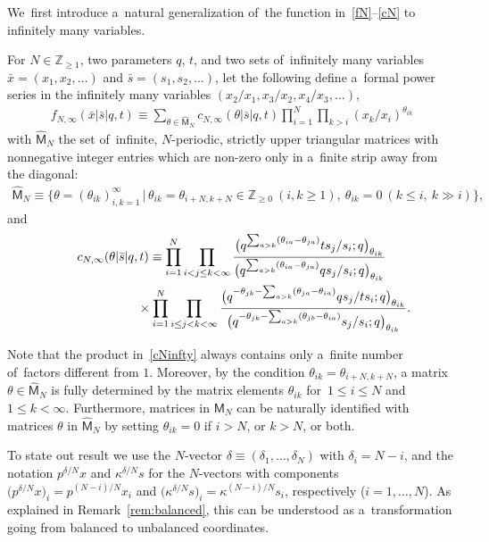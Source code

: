 \documentclass[pdftex]{sigma}%
\numberwithin{equation}{section}
\newcommand{\bx}{\bar{x}}
\newcommand{\bs}{\bar{s}}
\newcommand{\Z}{{\mathbb Z}}
\begin{document}
We~first introduce a~natural generalization of~the function in~\eqref{fN}--\eqref{cN} to infinitely many variables.
\begin{Definition}
\label{def2}
For $N\in\Z_{\geq 1}$, two parameters $q$, $t$, and two sets of~infinitely many variables $\bx=(x_1,x_2,\dots)$ and $\bs=(s_1,s_2,\dots)$, let the following define a~formal power series in the infinitely many variables
$(x_2/x_1,x_3/x_2,x_4/x_3,\dots)$,
\begin{gather}
\label{fNinfty}
 f_{N,\infty}(\bx|\bs|q,t) \equiv \sum_{\theta\in\hat{\mathsf{M}}_N} c_{N,\infty}(\theta|\bs|q,t) \prod_{i=1}^N \prod_{k>i} (x_k/x_i)^{\theta_{ik}}
\end{gather}
with $\hat{\mathsf{M}}_N$ the set of~infinite, $N$-periodic, strictly upper triangular matrices with nonnegative integer entries which are non-zero only in a~finite strip away from the diagonal:
\begin{gather}
\label{hMMN}
\hat{\mathsf{M}}_N\equiv \big\{ \theta=(\theta_{ik})_{i,k=1}^\infty\,|\, \theta_{ik}=\theta_{i+N,k+N}\in\Z_{\geq 0}\ (i,k\geq 1), \ \theta_{ik}=0\ (k\leq i,\ k\gg i)\big\} ,
\end{gather}
and
\begin{gather}
c_{N,\infty}(\theta|\bs|q,t)
\equiv
\prod_{i=1}^N \prod_{i< j\leq k< \infty}
\frac{\big(q^{\sum_{a> k}(\theta_{ia} - \theta_{ja})}ts_{j}/s_i;q\big)_{\theta_{ik}}}{\big(q^{\sum_{a> k}(\theta_{ia} - \theta_{ja})}qs_{j}/s_i;q\big)_{\theta_{ik}}}\nonumber
\\ \hphantom{c_{N,\infty}(\theta|\bs|q,t)\equiv }
{}\times\prod_{i=1}^N \prod_{i\leq j<k<\infty}
\frac{\big(q^{-\theta_{jk}-\sum_{a>k}(\theta_{ja}-\theta_{ia})}qs_{j}/ts_i ;q\big)_{\theta_{ik}}}{\big(q^{-\theta_{jk}-\sum_{a>k}(\theta_{jb}-\theta_{ia})}s_{j}/s_i ;q\big)_{\theta_{ik}}} .
\label{cNinfty}
\end{gather}

\end{Definition}

Note that the product in~\eqref{cNinfty} always contains only a~finite number of~factors different from $1$. Moreover, by the condition $\theta_{ik}=\theta_{i+N,k+N}$,
a matrix $\theta\in\hat{\mathsf{M}}_N$ is fully determined by the matrix elements $\theta_{ik}$ for~$1\leq i\leq N$ and $1\leq k<\infty$.
Furthermore, matrices in $\mathsf{M}_N$ can be naturally identified with matrices $\theta$ in $\hat{\mathsf{M}}_N$ by setting $\theta_{ik}=0$ if $i>N$, or $k>N$, or both.

To state out result we use the $N$-vector $\delta\equiv (\delta_1,\dots,\delta_N)$ with $\delta_i=N-i$, and the notation $p^{\delta/N}x$ and $\kappa^{\delta/N}s$ for the $N$-vectors with components
$\big(p^{\delta/N} x\big)_i=p^{(N-i)/N}x_i$ and $\big(\kappa^{\delta/N} s\big)_i=\kappa^{(N-i)/N}s_i$, respectively ($i=1,\dots,N$). As explained in Remark~\ref{rem:balanced}, this can be understood as a~transformation going from balanced to unbalanced coordinates.
\end{document}
